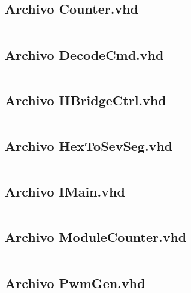 \documentclass[12pt]{article}
\begin{document}
\subsection{Archivo \textbf{Counter.vhd}}
\inputminted[bgcolor=bgcodecolor,xleftmargin=20pt,breaklines,linenos,fontsize=\scriptsize]{vhdl}{../GHDL/Counter.vhd}
\newpage

\subsection{Archivo \textbf{DecodeCmd.vhd}}
\inputminted[bgcolor=bgcodecolor,xleftmargin=20pt,breaklines,linenos,fontsize=\scriptsize]{vhdl}{../GHDL/DecodeCmd.vhd}
\newpage

\subsection{Archivo \textbf{HBridgeCtrl.vhd}}
\inputminted[bgcolor=bgcodecolor,xleftmargin=20pt,breaklines,linenos,fontsize=\scriptsize]{vhdl}{../GHDL/HBridgeCtrl.vhd}
\newpage

\subsection{Archivo \textbf{HexToSevSeg.vhd}}
\inputminted[bgcolor=bgcodecolor,xleftmargin=20pt,breaklines,linenos,fontsize=\scriptsize]{vhdl}{../GHDL/HexToSevSeg.vhd}
\newpage

\subsection{Archivo \textbf{IMain.vhd}}
\inputminted[bgcolor=bgcodecolor,xleftmargin=20pt,breaklines,linenos,fontsize=\scriptsize]{vhdl}{../GHDL/IMain.vhd}
\newpage

\subsection{Archivo \textbf{ModuleCounter.vhd}}
\inputminted[bgcolor=bgcodecolor,xleftmargin=20pt,breaklines,linenos,fontsize=\scriptsize]{vhdl}{../GHDL/ModuleCounter.vhd}
\newpage

\subsection{Archivo \textbf{PwmGen.vhd}}
\inputminted[bgcolor=bgcodecolor,xleftmargin=20pt,breaklines,linenos,fontsize=\scriptsize]{vhdl}{../GHDL/PwmGen.vhd}
\newpage
\end{document}
